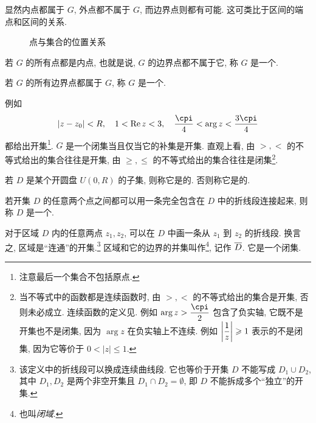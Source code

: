显然内点都属于 $G$, 外点都不属于 $G$, 而边界点则都有可能.
这可类比于区间的端点和区间的关系.

\begin{figure}[!htb]
  \centering
  \caption{点与集合的位置关系}
\end{figure}

\begin{definition}
  \begin{enuma}
    \item 若 $G$ 的所有点都是内点, 也就是说, $G$ 的边界点都不属于它, 称 $G$ 是一个.
    \item 若 $G$ 的所有边界点都属于 $G$, 称 $G$ 是一个.
  \end{enuma}
\end{definition}

例如
  \[|z-z_0|<R,\quad 1<\Re z<3,\quad\frac\cpi4<\arg z<\frac{3\cpi}4\]
都给出开集\footnote{注意最后一个集合不包括原点.}.
$G$ 是一个闭集当且仅当它的补集是开集.
直观上看, 由 $>,<$ 的不等式给出的集合往往是开集, 由 $\ge,\le$ 的不等式给出的集合往往是闭集\footnote{%
  当不等式中的函数都是连续函数时, 由 $>,<$ 的不等式给出的集合是开集, 否则未必成立.
  连续函数的定义见.
  例如 $\arg z>\dfrac\cpi2$ 包含了负实轴, 它既不是开集也不是闭集, 因为 $\arg z$ 在负实轴上不连续.
  例如 $\left|\dfrac1z\right|\geqslant 1$ 表示的不是闭集, 因为它等价于 $0<|z|\le1$.
}.

若 $D$ 是某个开圆盘 $U(0,R)$ 的子集, 则称它是的.
否则称它是的.

\begin{definition}
  若开集 $D$ 的任意两个点之间都可以用一条完全包含在 $D$ 中的折线段连接起来, 则称 $D$ 是一个.
\end{definition}

对于区域 $D$ 内的任意两点 $z_1,z_2$, 可以在 $D$ 中画一条从 $z_1$ 到 $z_2$ 的折线段.
换言之, 区域是``连通''的开集.\footnote{
  该定义中的折线段可以换成连续曲线段.
  它也等价于开集 $D$ 不能写成 $D_1\cup D_2$, 其中 $D_1,D_2$ 是两个非空开集且 $D_1\cap D_2=\emptyset$, 即 $D$ 不能拆成多个``独立''的开集.
}
区域和它的边界的并集叫作\footnote{
  也叫\emph{闭域}.
}, 记作 $\overline D$.
它是一个闭集.

